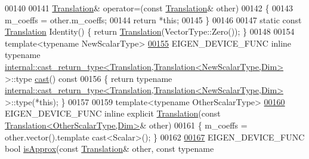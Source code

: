 \begin{DoxyCode}
00140 
00141   \hyperlink{group___geometry___module_class_eigen_1_1_translation}{Translation}& operator=(\textcolor{keyword}{const} \hyperlink{group___geometry___module_class_eigen_1_1_translation}{Translation}& other)
00142   \{
00143     m\_coeffs = other.m\_coeffs;
00144     \textcolor{keywordflow}{return} *\textcolor{keyword}{this};
00145   \}
00146 
00147   \textcolor{keyword}{static} \textcolor{keyword}{const} \hyperlink{group___geometry___module_class_eigen_1_1_translation}{Translation} Identity() \{ \textcolor{keywordflow}{return} \hyperlink{group___geometry___module_a6220051bf3a13f8180ddefbae198493e}{Translation}(VectorType::Zero()); \}
00148 
00154   \textcolor{keyword}{template}<\textcolor{keyword}{typename} NewScalarType>
\hyperlink{group___geometry___module_a1d30bbadbafd009cda142f15ff7abcc2}{00155}   EIGEN\_DEVICE\_FUNC \textcolor{keyword}{inline} \textcolor{keyword}{typename} 
      \hyperlink{struct_eigen_1_1internal_1_1cast__return__type}{internal::cast\_return\_type<Translation,Translation<NewScalarType,Dim>}
       >::type \hyperlink{group___geometry___module_a1d30bbadbafd009cda142f15ff7abcc2}{cast}()\textcolor{keyword}{ const}
00156 \textcolor{keyword}{  }\{ \textcolor{keywordflow}{return} \textcolor{keyword}{typename} 
      \hyperlink{struct_eigen_1_1internal_1_1cast__return__type}{internal::cast\_return\_type<Translation,Translation<NewScalarType,Dim>}
       >::type(*\textcolor{keyword}{this}); \}
00157 
00159   \textcolor{keyword}{template}<\textcolor{keyword}{typename} OtherScalarType>
\hyperlink{group___geometry___module_a8d5e06de92ca432d94f661ace3f0a274}{00160}   EIGEN\_DEVICE\_FUNC \textcolor{keyword}{inline} \textcolor{keyword}{explicit} \hyperlink{group___geometry___module_a8d5e06de92ca432d94f661ace3f0a274}{Translation}(\textcolor{keyword}{const} 
      \hyperlink{group___geometry___module_class_eigen_1_1_translation}{Translation<OtherScalarType,Dim>}& other)
00161   \{ m\_coeffs = other.vector().template cast<Scalar>(); \}
00162 
\hyperlink{group___geometry___module_a3610eaa76745dd8f2c76dd9cc949dfa5}{00167}   EIGEN\_DEVICE\_FUNC \textcolor{keywordtype}{bool} \hyperlink{group___geometry___module_a3610eaa76745dd8f2c76dd9cc949dfa5}{isApprox}(\textcolor{keyword}{const} \hyperlink{group___geometry___module_class_eigen_1_1_translation}{Translation}& other, \textcolor{keyword}{const} \textcolor{keyword}{typename} 

\end{DoxyCode}
